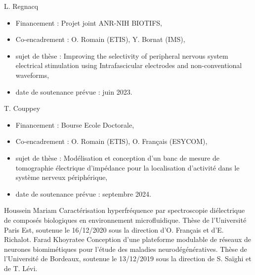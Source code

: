 
\begin{cvskills}
  \cvskill
    {L. Regnacq} %
    {\begin{itemize}
    	\item Financement : Projet joint ANR-NIH BIOTIFS,
    	\item Co-encadrement : O. Romain (ETIS), Y. Bornat (IMS),
    	\item sujet de thèse : Improving the selectivity of peripheral nervous system electrical stimulation using Intrafascicular electrodes and non-conventional waveforms,
    	\item date de soutenance prévue : juin 2023.
    \end{itemize}
    } %
  \cvskill
    {T. Couppey} %
    {\begin{itemize}
    	\item Financement : Bourse Ecole Doctorale,
    	\item Co-encadrement : O. Romain (ETIS), O. Français (ESYCOM),
    	\item sujet de thèse : Modélisation et conception d'un banc de mesure de tomographie électrique d'impédance pour la localisation d'activité dans le système nerveux périphérique,
    	\item date de soutenance prévue : septembre 2024.
    \end{itemize}
    } %
\end{cvskills}

\begin{cvskills}
\cvskill
    {Houssein Mariam} %
    {Caractérisation hyperfréquence par spectroscopie diélectrique de composés biologiques en environnement microfluidique. Thèse de l'Université Paris Est, soutenue le 16/12/2020 sous la direction d'O. Français et d'E. Richalot.
    } %
\cvskill
    {Farad Khoyratee} %
    {Conception d’une plateforme modulable de réseaux de neurones biomimétiques pour l’étude des maladies neurodégénératives. Thèse de l'Université de Bordeaux, soutenue le 13/12/2019 sous la direction de S. Saïghi et de T. Lévi.
    } %
\end{cvskills}